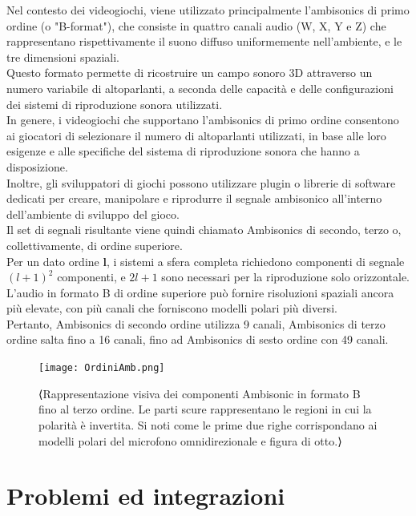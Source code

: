       Nel contesto dei videogiochi, viene utilizzato principalmente l'ambisonics di primo ordine (o "B-format"), che consiste in quattro canali audio (W, X, Y e Z) che rappresentano rispettivamente il suono diffuso uniformemente nell'ambiente, e le tre dimensioni spaziali.\\
      Questo formato permette di ricostruire un campo sonoro 3D attraverso un numero variabile di altoparlanti, a seconda delle capacità e delle configurazioni dei sistemi di riproduzione sonora utilizzati.\\
      In genere, i videogiochi che supportano l'ambisonics di primo ordine consentono ai giocatori di selezionare il numero di altoparlanti utilizzati, in base alle loro esigenze e alle specifiche del sistema di riproduzione sonora che hanno a disposizione.\\
      Inoltre, gli sviluppatori di giochi possono utilizzare plugin o librerie di software dedicati per creare, manipolare e riprodurre il segnale ambisonico all'interno dell'ambiente di sviluppo del gioco.\\
      Il set di segnali risultante viene quindi chiamato Ambisonics di secondo, terzo o, collettivamente, di ordine superiore.\\
      Per un dato ordine $\mathbf{l}$, i sistemi a sfera completa richiedono componenti di segnale $(l+1)^{2}$ componenti, e $2l+1$ sono necessari per la riproduzione solo orizzontale.\\
      L'audio in formato B di ordine superiore può fornire risoluzioni spaziali ancora più elevate, con più canali che forniscono modelli polari più diversi.\\
      Pertanto, Ambisonics di secondo ordine utilizza 9 canali,
      Ambisonics di terzo ordine salta fino a 16 canali, fino ad Ambisonics di sesto ordine con 49 canali.
\\
      \begin{figure}[h]
            \centering
            \texttt{[image: OrdiniAmb.png]}
            \caption{⟨Rappresentazione visiva dei componenti Ambisonic in formato B fino al terzo ordine.
            Le parti scure rappresentano le regioni in cui la polarità è invertita.
            Si noti come le prime due righe corrispondano ai modelli polari del microfono omnidirezionale e figura di otto.⟩}
            \label{fig:⟨etichetta⟩}
            \end{figure}

      \section{Problemi ed integrazioni}

